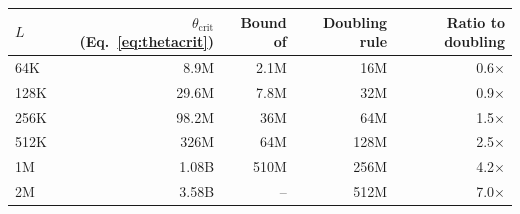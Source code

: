 \begin{tabular}{lrrrr}
\toprule
$L$ & $\theta_{\mathrm{crit}}$ (Eq.~\ref{eq:thetacrit}) & Bound of \citet{men2024base} & Doubling rule & Ratio to doubling \\
\midrule
64K & 8.9M & 2.1M & 16M & 0.6$\times$ \\
128K & 29.6M & 7.8M & 32M & 0.9$\times$ \\
256K & 98.2M & 36M & 64M & 1.5$\times$ \\
512K & 326M & 64M & 128M & 2.5$\times$ \\
1M & 1.08B & 510M & 256M & 4.2$\times$ \\
2M & 3.58B & -- & 512M & 7.0$\times$ \\
\bottomrule
\end{tabular}
